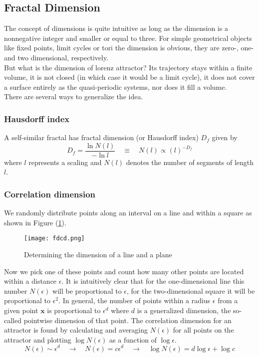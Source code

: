 \subsection{Fractal Dimension}{\label{sec:fd}}
The concept of dimensions is quite intuitive as long as the dimension is a nonnegative integer and smaller or equal to three.
For simple geometrical objects like fixed points, limit cycles or tori the dimension is obvious, they are zero-, one- and two dimensional, respectively.\\
But what is the dimension of lorenz attractor? Its trajectory stays within a finite volume, it is not closed (in which case it would be a limit cycle), it does not cover a surface entirely as the quasi-periodic systems, nor does it fill a volume.\\
There are several ways to generalize the idea.
\subsubsection{Hausdorff index}
A self-similar fractal has fractal dimension (or Hausdorff index) $D_f$ given by
\begin{equation}
	D_f=\frac{\ln N(l)}{-\ln l}\quad\equiv\quad N(l)\propto(l)^{-D_f}
\end{equation}
where $l$ represents a scaling and $N(l)$ denotes the number of segments of length $l$. 
\subsubsection{Correlation dimension}
We randomly distribute points along an interval on a line and within a square as shown in Figure (\ref{fig:fdcd}).
\begin{figure}[h!]
	\centering
	\texttt{[image: fdcd.png]}
	\caption{Determining the dimension of a line and a plane}
	\label{fig:fdcd}
\end{figure}
Now we pick one of these points and count how many other points are located within a distance $\epsilon$.
It is intuitively clear that for the one-dimensional line this number $N(\epsilon)$ will be proportional to $\epsilon$, for the two-dimensional square it will be proportional to $\epsilon^2$.
In general, the number of points within a radius $\epsilon$ from a given point $\mathbf{x}$ is proportional to $\epsilon^d$ where $d$ is a generalized dimension, the so-called pointwise dimension of that point.
The correlation dimension for an attractor is found by calculating and averaging $N(\epsilon)$ for all points on the attractor and plotting $\log N(\epsilon)$ as a function of $\log\epsilon$.
\begin{equation}
	N(\epsilon)\sim\epsilon^d\quad\rightarrow\quad N(\epsilon)=c\epsilon^d\quad\rightarrow\quad\log N(\epsilon)=d\log\epsilon+\log c
\end{equation}
